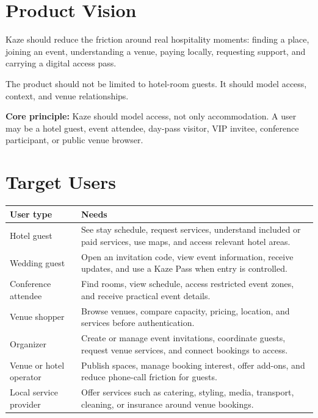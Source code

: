 \documentclass[11pt,a4paper]{article}
\begin{document}
\section{Product Vision}

Kaze should reduce the friction around real hospitality moments: finding a place, joining an event, understanding a venue, paying locally, requesting support, and carrying a digital access pass.

The product should not be limited to hotel-room guests. It should model access, context, and venue relationships.

\begin{kazehighlightbox}
\textbf{Core principle:} Kaze should model access, not only accommodation. A user may be a hotel guest, event attendee, day-pass visitor, VIP invitee, conference participant, or public venue browser.
\end{kazehighlightbox}

\section{Target Users}

\begin{longtable}{p{} p{}}
\textbf{User type} & \textbf{Needs} \\
\midrule
Hotel guest & See stay schedule, request services, understand included or paid services, use maps, and access relevant hotel areas. \\
Wedding guest & Open an invitation code, view event information, receive updates, and use a Kaze Pass when entry is controlled. \\
Conference attendee & Find rooms, view schedule, access restricted event zones, and receive practical event details. \\
Venue shopper & Browse venues, compare capacity, pricing, location, and services before authentication. \\
Organizer & Create or manage event invitations, coordinate guests, request venue services, and connect bookings to access. \\
Venue or hotel operator & Publish spaces, manage booking interest, offer add-ons, and reduce phone-call friction for guests. \\
Local service provider & Offer services such as catering, styling, media, transport, cleaning, or insurance around venue bookings. \\
\end{longtable}
\end{document}
